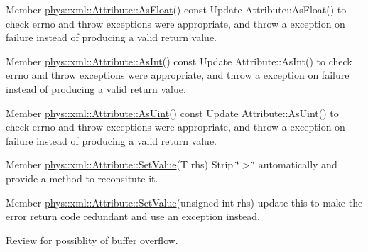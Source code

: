 \label{todo__todo000045}
\hypertarget{todo__todo000045}{}
 
\begin{DoxyDescription}
\item[Member \hyperlink{classphys_1_1xml_1_1Attribute_aad74f805b9318735011d698ee39113aa}{phys::xml::Attribute::AsFloat}() const  ]Update Attribute::AsFloat() to check errno and throw exceptions were appropriate, and throw a exception on failure instead of producing a valid return value. 
\end{DoxyDescription}

\label{todo__todo000042}
\hypertarget{todo__todo000042}{}
 
\begin{DoxyDescription}
\item[Member \hyperlink{classphys_1_1xml_1_1Attribute_ada1f2e45ce636ad8482972263364e7fa}{phys::xml::Attribute::AsInt}() const  ]Update Attribute::AsInt() to check errno and throw exceptions were appropriate, and throw a exception on failure instead of producing a valid return value. 
\end{DoxyDescription}

\label{todo__todo000043}
\hypertarget{todo__todo000043}{}
 
\begin{DoxyDescription}
\item[Member \hyperlink{classphys_1_1xml_1_1Attribute_ad00ec5857fc4afcda892a0057419a9a0}{phys::xml::Attribute::AsUint}() const  ]Update Attribute::AsUint() to check errno and throw exceptions were appropriate, and throw a exception on failure instead of producing a valid return value. 
\end{DoxyDescription}

\label{todo__todo000039}
\hypertarget{todo__todo000039}{}
 
\begin{DoxyDescription}
\item[Member \hyperlink{classphys_1_1xml_1_1Attribute_af9b12723a227b833d7f8986a524b0e48}{phys::xml::Attribute::SetValue}(T rhs) ]Strip \char`\"{}$>$\char`\"{} automatically and provide a method to reconsitute it. 
\end{DoxyDescription}

\label{todo__todo000036}
\hypertarget{todo__todo000036}{}
 
\begin{DoxyDescription}
\item[Member \hyperlink{classphys_1_1xml_1_1Attribute_a289ac36b218f3912224fd904ccade1ed}{phys::xml::Attribute::SetValue}(unsigned int rhs) ]update this to make the error return code redundant and use an exception instead. 

Review for possiblity of buffer overflow. 
\end{DoxyDescription}

